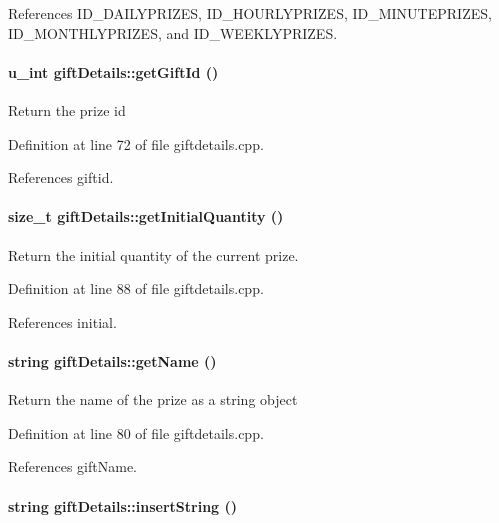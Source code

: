 References ID\_\-DAILYPRIZES, ID\_\-HOURLYPRIZES, ID\_\-MINUTEPRIZES, ID\_\-MONTHLYPRIZES, and ID\_\-WEEKLYPRIZES.\hypertarget{classgiftDetails_giftDetailsa4}{
\paragraph[getGiftId]{\setlength{\rightskip}{0pt plus 5cm}u\_\-int gift\-Details::get\-Gift\-Id ()}\hfill}
\label{classgiftDetails_giftDetailsa4}


Return the prize id 

Definition at line 72 of file giftdetails.cpp.

References giftid.\hypertarget{classgiftDetails_giftDetailsa6}{
\paragraph[getInitialQuantity]{\setlength{\rightskip}{0pt plus 5cm}size\_\-t gift\-Details::get\-Initial\-Quantity ()}\hfill}
\label{classgiftDetails_giftDetailsa6}


Return the initial quantity of the current prize. 

Definition at line 88 of file giftdetails.cpp.

References initial.\hypertarget{classgiftDetails_giftDetailsa5}{
\paragraph[getName]{\setlength{\rightskip}{0pt plus 5cm}string gift\-Details::get\-Name ()}\hfill}
\label{classgiftDetails_giftDetailsa5}


Return the name of the prize as a string object 

Definition at line 80 of file giftdetails.cpp.

References gift\-Name.\hypertarget{classgiftDetails_giftDetailsa12}{
\paragraph[insertString]{\setlength{\rightskip}{0pt plus 5cm}string gift\-Details::insert\-String ()}\hfill}
\label{classgiftDetails_giftDetailsa12}


